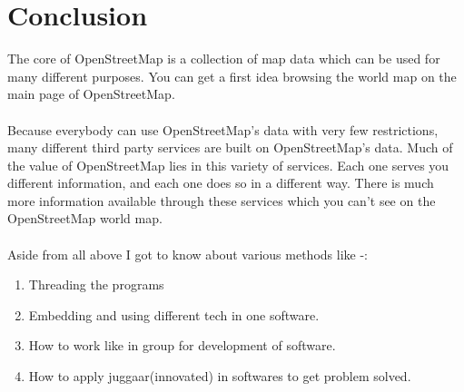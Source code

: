 \section{Conclusion}
The core of OpenStreetMap is a collection of map data which can be used for many different purposes. You can get a first idea browsing the world map on the main page of OpenStreetMap.\\\\
Because everybody can use OpenStreetMap's data with very few restrictions, many different third party services are built on OpenStreetMap's data. Much of the value of OpenStreetMap lies in this variety of services. Each one serves you different information, and each one does so in a different way. There is much more information available through these services which you can't see on the OpenStreetMap world map.\\\\
Aside from all above I got to know about various methods like -:
\begin{enumerate}
\item Threading the programs 
\item Embedding and using different tech in one software.
\item How to work like in group for development of software.
\item How to apply juggaar(innovated) in softwares to get problem solved. 
\end{enumerate}

